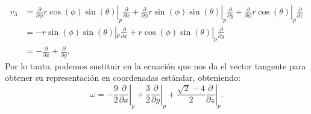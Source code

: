 \begin{example}
\begin{align*}
		v_3 & =
		\left. \frac{\partial}{\partial \phi} r\cos(\phi)\sin(\theta) \right|_p
		\frac{\partial}{\partial x} +
		\left. \frac{\partial}{\partial \phi} r\sin(\phi)\sin(\theta)\right|_p
		\frac{\partial}{\partial y} +
		\left. \frac{\partial}{\partial \phi} r\cos(\theta)\right|_{p}
		\frac{\partial}{\partial z}                                          \\
		    & = -r\sin(\phi)\sin(\theta)|_p \frac{\partial}{\partial x}
		+ r\cos(\phi)\sin(\theta)|_p  \frac{\partial}{\partial y}            \\
		    & = - \frac{\partial}{\partial x} + \frac{\partial}{\partial y}.
	\end{align*}
	Por lo tanto, podemos sustituir en la ecuación que nos da el vector tangente para obtener su representación en coordenadas estándar, obteniendo:
	\[ \omega =
		\left. -\frac{9}{2} \frac{\partial}{\partial x} \right|_p +
		\left. \frac{3}{2}\frac{\partial}{\partial y} \right|_p +
		\left. \frac{\sqrt{2} - 4}{2} \frac{\partial}{\partial z} \right|_p .\]
\end{example}
